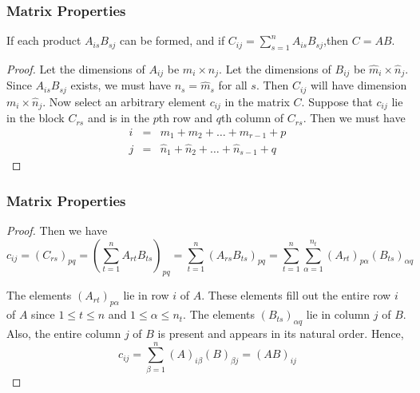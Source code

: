 \documentclass[notheorems,mathserif,table,compress]{beamer}  %
\begin{document}
\begin{frame}
\frametitle{Matrix Properties}
\begin{theorem}
If each product $A_{is}B_{sj}$ can be formed, and if $C_{ij}=\sum_{s=1}^nA_{is}B_{sj}$,then $C=AB$.       
\end{theorem}
\begin{proof}
Let the dimensions of $A_{ij}$ be $m_i\times n_j$. Let the dimensions of $B_{ij}$ be $\widehat m_i\times \widehat n_j$. Since $A_{is}B_{sj}$ exists, we must have $n_s=\widehat m_s$ for all $s$. Then $C_{ij}$ will have dimension $m_i\times \widehat n_j$. Now select an arbitrary element $c_{ij}$ in the matrix $C$. Suppose that $c_{ij}$ lie in the block $C_{rs}$ and is in the $p$th row and $q$th column of $C_{rs}$. Then we must have 
\begin{eqnarray*}
i&=&m_1+m_2+\ldots+m_{r-1}+p\\
j&=&\widehat n_1+\widehat n_2+\ldots+\widehat n_{s-1}+q
\end{eqnarray*}

\end{proof}
\end{frame}

\begin{frame}
\frametitle{Matrix Properties}
\begin{proof}
Then we have  
\begin{displaymath}
c_{ij}=(C_{rs})_{pq}=(\sum_{t=1}^{n}A_{rt}B_{ts})_{pq}=\sum_{t=1}^{n}(A_{rs}B_{ts})_{pq}=\sum_{t=1}^{n}\sum_{\alpha=1}^{n_t}(A_{rt})_{p\alpha}(B_{ts})_{\alpha q}
\end{displaymath}

The elements $(A_{rt})_{p\alpha}$ lie in row $i$ of $A$. These elements fill out the entire row $i$ of $A$ since $1\leq t \leq n$ and $1\leq \alpha \leq n_t$. The elements $(B_{ts})_{\alpha q}$ lie in column $j$ of $B$. Also, the entire column $j$ of $B$ is present and appears in its natural order. Hence,
\begin{displaymath}
c_{ij}=\sum_{\beta=1}^{n}(A)_{i\beta}(B)_{\beta j}=(AB)_{ij}
\end{displaymath}

\end{proof}
\end{frame}
\end{document}
